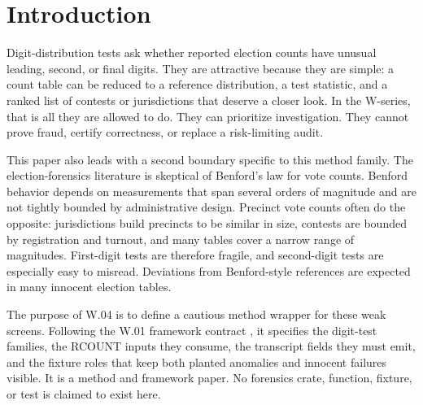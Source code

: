 \section{Introduction}

Digit-distribution tests ask whether reported election counts have unusual
leading, second, or final digits. They are attractive because they are simple:
a count table can be reduced to a reference distribution, a test statistic, and
a ranked list of contests or jurisdictions that deserve a closer look. In the
W-series, that is all they are allowed to do. They can prioritize
investigation. They cannot prove fraud, certify correctness, or replace a
risk-limiting audit.

This paper also leads with a second boundary specific to this method family.
The election-forensics literature is skeptical of Benford's law for vote
counts. Benford behavior depends on measurements that span several orders of
magnitude and are not tightly bounded by administrative design. Precinct vote
counts often do the opposite: jurisdictions build precincts to be similar in
size, contests are bounded by registration and turnout, and many tables cover a
narrow range of magnitudes. First-digit tests are therefore fragile, and
second-digit tests are especially easy to misread. Deviations from Benford-style
references are expected in many innocent election tables.

The purpose of W.04 is to define a cautious method wrapper for these weak
screens. Following the W.01 framework contract \citep{w01-forensic-analytics-2026},
it specifies the digit-test families, the RCOUNT inputs they consume, the
transcript fields they must emit, and the fixture roles that keep both planted
anomalies and innocent failures visible. It is a method and framework paper. No
forensics crate, function, fixture, or test is claimed to exist here.
